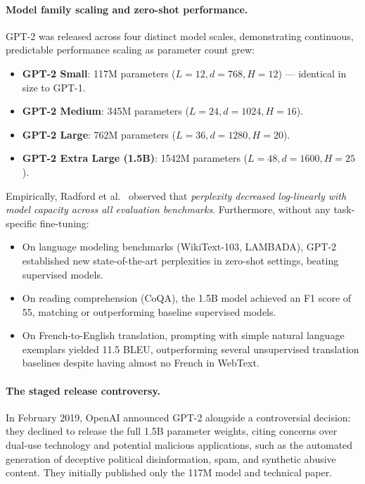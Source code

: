 \documentclass[../../main.tex]{subfiles}
\begin{document}
\paragraph{Model family scaling and zero-shot performance.}
GPT-2 was released across four distinct model scales, demonstrating continuous, predictable performance scaling as parameter count grew:
\begin{itemize}
    \item \textbf{GPT-2 Small}: 117M parameters ($L = 12, d = 768, H = 12$) --- identical in size to GPT-1.
    \item \textbf{GPT-2 Medium}: 345M parameters ($L = 24, d = 1024, H = 16$).
    \item \textbf{GPT-2 Large}: 762M parameters ($L = 36, d = 1280, H = 20$).
    \item \textbf{GPT-2 Extra Large (1.5B)}: 1542M parameters ($L = 48, d = 1600, H = 25$).
\end{itemize}

Empirically, Radford et al.~\cite{radford2019} observed that \emph{perplexity decreased log-linearly with model capacity across all evaluation benchmarks}. Furthermore, without any task-specific fine-tuning:
\begin{itemize}
    \item On language modeling benchmarks (WikiText-103, LAMBADA), GPT-2 established new state-of-the-art perplexities in zero-shot settings, beating supervised models.
    \item On reading comprehension (CoQA), the 1.5B model achieved an F1 score of 55, matching or outperforming baseline supervised models.
    \item On French-to-English translation, prompting with simple natural language exemplars yielded 11.5 BLEU, outperforming several unsupervised translation baselines despite having almost no French in WebText.
\end{itemize}

\paragraph{The staged release controversy.}
In February 2019, OpenAI announced GPT-2 alongside a controversial decision: they declined to release the full 1.5B parameter weights, citing concerns over dual-use technology and potential malicious applications, such as the automated generation of deceptive political disinformation, spam, and synthetic abusive content. They initially published only the 117M model and technical paper. 
\end{document}
